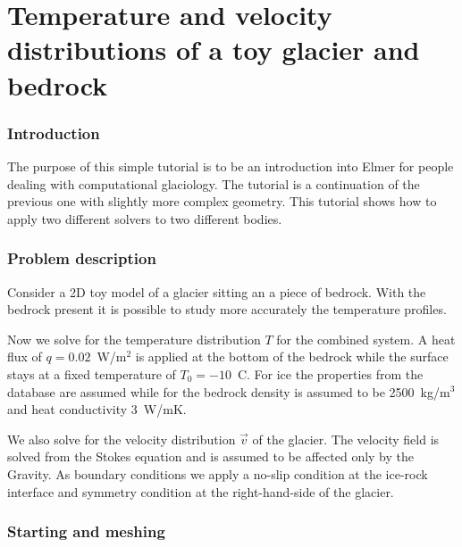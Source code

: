 \chapter{Temperature and velocity distributions of a toy glacier and bedrock}



\subsection*{Introduction}

The purpose of this simple tutorial is to be an introduction into Elmer for people dealing with computational glaciology.
The tutorial is a continuation of the previous one with slightly more complex geometry. 
This tutorial shows how to apply two different solvers to two different bodies. 




\subsection*{Problem description}

Consider a 2D toy model of a glacier sitting an a piece of bedrock. 
With the bedrock present it is possible to study more accurately the temperature profiles. 

Now we solve for the temperature distribution $T$ for the combined system.
A heat flux of $q=0.02$~W/m$^2$ is applied at the bottom of the bedrock while the surface stays at a
fixed temperature of $T_0=-10$~C. For ice the properties from the database are assumed while for
the bedrock density is assumed to be 2500~kg/m$^3$ and heat conductivity 3~W/mK. 

We also solve for the velocity distribution $\vec{v}$ of the glacier. 
The velocity field is solved from the Stokes equation and is assumed to be affected only by the Gravity.
As boundary conditions we apply a no-slip condition at the ice-rock interface and symmetry condition at the right-hand-side of the glacier. 



\subsection*{Starting and meshing}

